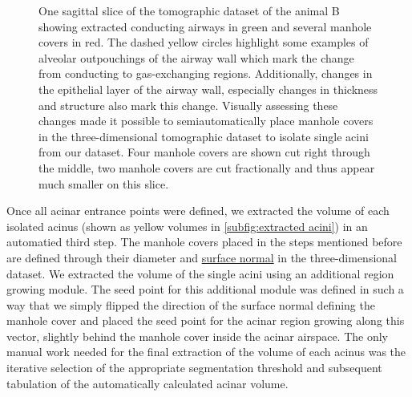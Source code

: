 \documentclass[twoside,paper=a4,abstract=true,english,DIVcalc]{scrartcl}
\newlength\imagescale		%
\begin{document}
\begin{figure}
%
	\caption{One sagittal slice of the tomographic dataset of the animal B showing extracted conducting airways in green and several manhole covers in red. The dashed yellow circles highlight some examples of alveolar outpouchings of the airway wall which mark the change from conducting to gas-exchanging regions. Additionally, changes in the epithelial layer of the airway wall, especially changes in thickness and structure also mark this change. Visually assessing these changes made it possible to semiautomatically place manhole covers in the three-dimensional tomographic dataset to isolate single acini from our dataset. Four manhole covers are shown cut right through the middle, two manhole covers are cut fractionally and thus appear much smaller on this slice.}
	\label{fig:ManholeCoverExplanation}
\end{figure}

Once all acinar entrance points were defined, we extracted the volume of each isolated acinus (shown as yellow volumes in \autoref{subfig:extracted acini}) in an automatied third step. The manhole covers placed in the steps mentioned before are defined through their diameter and \href{https://secure.wikimedia.org/wikipedia/en/w/index.php?title=Surface_normal&oldid=411684319}{surface normal} in the three-dimensional dataset. We extracted the volume of the single acini using an additional region growing module. The seed point for this additional module was defined in such a way that we simply flipped the direction of the surface normal defining the manhole cover and placed the seed point for the acinar region growing along this vector, slightly behind the manhole cover inside the acinar airspace. The only manual work needed for the final extraction of the volume of each acinus was the iterative selection of the appropriate segmentation threshold and subsequent tabulation of the automatically calculated acinar volume.
\end{document}
